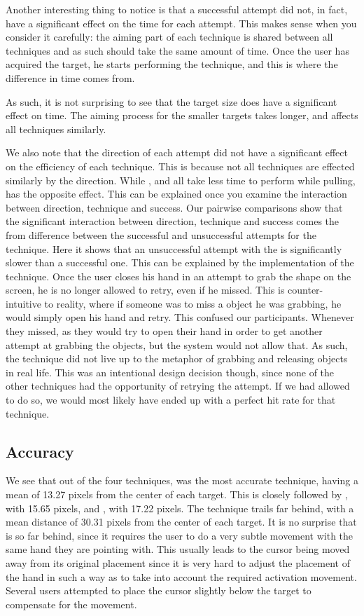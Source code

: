 Another interesting thing to notice is that a successful attempt did not, in fact, have a significant effect on the time for each attempt.
This makes sense when you consider it carefully: the aiming part of each technique is shared between all techniques and as such should take the same amount of time.
Once the user has acquired the target, he starts performing the technique, and this is where the difference in time comes from.

As such, it is not surprising to see that the target size does have a significant effect on time.
The aiming process for the smaller targets takes longer, and affects all techniques similarly.

We also note that the direction of each attempt did not have a significant effect on the efficiency of each technique. 
This is because not all techniques are effected similarly by the direction. 
While \swipe, \throw and \tilt all take less time to perform while pulling, \grab has the opposite effect.
This can be explained once you examine the interaction between direction, technique and success.
Our pairwise comparisons show that the significant interaction between direction, technique and success comes the from difference between the successful and unsuccessful attempts for the \grab \pull technique. 
Here it shows that an unsuccessful attempt with the \grab \pull is significantly slower than a successful one. 
This can be explained by the implementation of the technique. 
Once the user closes his hand in an attempt to grab the shape on the screen, he is no longer allowed to retry, even if he missed.
This is counter-intuitive to reality, where if someone was to miss a object he was grabbing, he would simply open his hand and retry.
This confused our participants. 
Whenever they missed, as they would try to open their hand in order to get another attempt at grabbing the objects, but the system would not allow that.
As such, the \grab \pull technique did not live up to the metaphor of grabbing and releasing objects in real life.
This was an intentional design decision though, since none of the other techniques had the opportunity  of retrying the attempt.
If we had allowed \grab \pull to do so, we would most likely have ended up with a perfect hit rate for that technique. 

\subsection{Accuracy}
\label{sec:accuracy}
We see that out of the four techniques, \swipe was the most accurate technique, having a mean of 13.27 pixels from the center of each target. 
This is closely followed by \throw, with 15.65 pixels, and \grab, with 17.22 pixels.
The \tilt technique trails far behind, with a mean distance of 30.31 pixels from the center of each target.   
It is no surprise that \tilt is so far behind, since it requires the user to do a very subtle movement with the same hand they are pointing with.
This usually leads to the cursor being moved away from its original placement since it is very hard to adjust the placement of the hand in such a way as to take into account the required activation movement. 
Several users attempted to place the cursor slightly below the target to compensate for the movement. 

